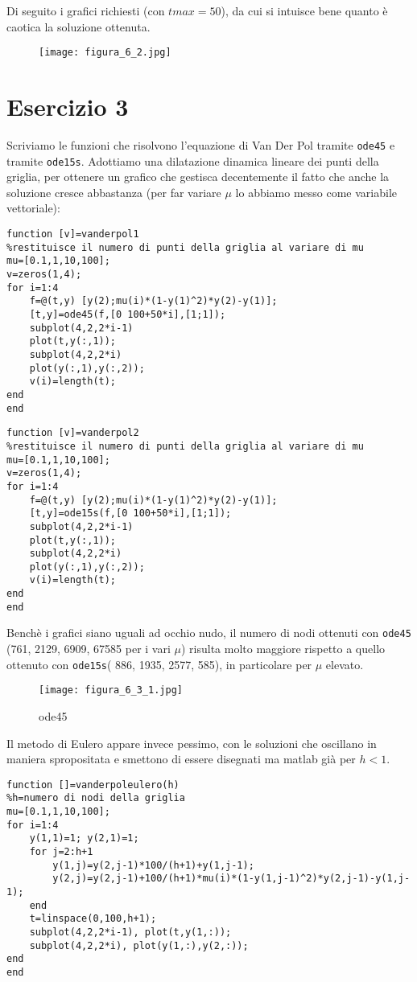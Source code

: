 \documentclass{article}
\begin{document}
\noindent
Di seguito i grafici richiesti (con $tmax=50$), da cui si intuisce bene quanto è caotica la soluzione ottenuta.

\begin{figure}[!h]
\centering
\texttt{[image: figura\_6\_2.jpg]}
\end{figure}

\newpage

\section*{Esercizio 3}

Scriviamo le funzioni che risolvono l'equazione di Van Der Pol tramite \texttt{ode45} e tramite \texttt{ode15s}. Adottiamo una dilatazione dinamica lineare dei punti della griglia, per ottenere un grafico che gestisca decentemente il fatto che anche la soluzione cresce abbastanza (per far variare $\mu$ lo abbiamo messo come variabile vettoriale):
\begin{lstlisting}
function [v]=vanderpol1
%restituisce il numero di punti della griglia al variare di mu
mu=[0.1,1,10,100];
v=zeros(1,4);
for i=1:4
    f=@(t,y) [y(2);mu(i)*(1-y(1)^2)*y(2)-y(1)];
    [t,y]=ode45(f,[0 100+50*i],[1;1]);
    subplot(4,2,2*i-1)
    plot(t,y(:,1));
    subplot(4,2,2*i)
    plot(y(:,1),y(:,2));
    v(i)=length(t);
end
end
\end{lstlisting}

\begin{lstlisting}
function [v]=vanderpol2
%restituisce il numero di punti della griglia al variare di mu
mu=[0.1,1,10,100];
v=zeros(1,4);
for i=1:4
    f=@(t,y) [y(2);mu(i)*(1-y(1)^2)*y(2)-y(1)];
    [t,y]=ode15s(f,[0 100+50*i],[1;1]);
    subplot(4,2,2*i-1)
    plot(t,y(:,1));
    subplot(4,2,2*i)
    plot(y(:,1),y(:,2));
    v(i)=length(t);
end
end
\end{lstlisting}

\noindent
Benchè i grafici siano uguali ad occhio nudo, il numero di nodi ottenuti con \texttt{ode45} (761, 2129, 6909, 67585 per i vari $\mu$) risulta molto maggiore rispetto a quello ottenuto con \texttt{ode15s}( 886, 1935, 2577, 585), in particolare per $\mu$ elevato.

\begin{figure} 
\centering
\texttt{[image: figura\_6\_3\_1.jpg]}
\caption{ode45}
\end{figure}

\noindent
Il metodo di Eulero appare invece pessimo, con le soluzioni che oscillano in maniera spropositata e smettono di essere disegnati ma matlab già per $h<1$.

\begin{lstlisting}
function []=vanderpoleulero(h)
%h=numero di nodi della griglia
mu=[0.1,1,10,100];
for i=1:4
    y(1,1)=1; y(2,1)=1;
    for j=2:h+1
        y(1,j)=y(2,j-1)*100/(h+1)+y(1,j-1);
        y(2,j)=y(2,j-1)+100/(h+1)*mu(i)*(1-y(1,j-1)^2)*y(2,j-1)-y(1,j-1);
    end
    t=linspace(0,100,h+1);
    subplot(4,2,2*i-1), plot(t,y(1,:));
    subplot(4,2,2*i), plot(y(1,:),y(2,:));
end
end
\end{lstlisting}

\clearpage
\end{document}
